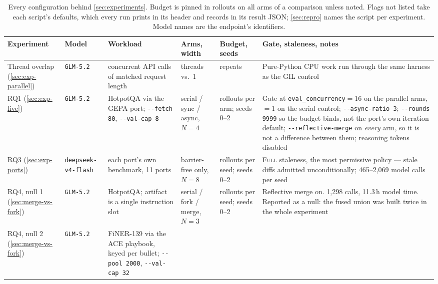 \documentclass{article}
\newcommand{\code}[1]{\texttt{#1}}
\begin{document}
\begin{table}[p]
\centering
\scriptsize
\setlength{\tabcolsep}{3.5pt}
\caption{Every configuration behind \cref{sec:experiments}. Budget is pinned in rollouts on all arms of a comparison unless noted. Flags not listed take each script's defaults, which every run prints in its header and records in its result JSON; \cref{sec:repro} names the script per experiment. Model names are the endpoint's identifiers.}
\label{tab:config}
\begin{tabular}{@{}>{\raggedright\arraybackslash}p{1.95cm}>{\raggedright\arraybackslash}p{1.95cm}>{\raggedright\arraybackslash}p{2.6cm}>{\raggedright\arraybackslash}p{1.7cm}>{\raggedright\arraybackslash}p{2.05cm}>{\raggedright\arraybackslash}p{3.8cm}@{}}
\toprule
\textbf{Experiment} & \textbf{Model} & \textbf{Workload} & \textbf{Arms, width} & \textbf{Budget, seeds} & \textbf{Gate, staleness, notes} \\
\midrule
Thread overlap (\cref{sec:exp-parallel})
& \code{GLM-5.2}
& 8 concurrent API calls of matched request length
& 8 threads vs.~1
& 3 repeats
& Pure-Python CPU work run through the same harness as the GIL control \\
\addlinespace
RQ1 (\cref{sec:exp-live})
& \code{GLM-5.2}
& HotpotQA via the GEPA port; \code{-{}-fetch 80}, \code{-{}-val-cap 8}
& serial / sync / async, $N{=}4$
& 16 rollouts per arm; seeds 0--2
& Gate at \code{eval\_concurrency}${=}16$ on the parallel arms, ${=}1$ on the serial control; \code{-{}-async-ratio 3}; \code{-{}-rounds 9999} so the budget binds, not the port's own iteration default; \code{-{}-reflective-merge} on \emph{every} arm, so it is not a difference between them; reasoning tokens disabled \\
\addlinespace
RQ3 (\cref{sec:exp-ports})
& \code{deepseek-}\allowbreak\code{v4-flash}
& each port's own benchmark, 11 ports
& barrier-free only, $N{=}8$
& 80 rollouts per seed; seeds 0--2
& \textsc{Full} staleness, the most permissive policy --- stale diffs admitted unconditionally; 465--2{,}069 model calls per seed \\
\addlinespace
RQ4, null 1 (\cref{sec:merge-vs-fork})
& \code{GLM-5.2}
& HotpotQA; artifact is a single instruction slot
& serial / fork / merge, $N{=}3$
& 9 rollouts per seed; seeds 0--2
& Reflective merge on. 1{,}298 calls, 11.3\,h model time. Reported as a null: the fused union was built twice in the whole experiment \\
\addlinespace
RQ4, null 2 (\cref{sec:merge-vs-fork})
& \code{GLM-5.2}
& FiNER-139 via the ACE playbook, keyed per bullet; \code{-{}-pool 2000}, \code{-{}-val-cap 32}

\end{tabular}
\end{table}
\end{document}
